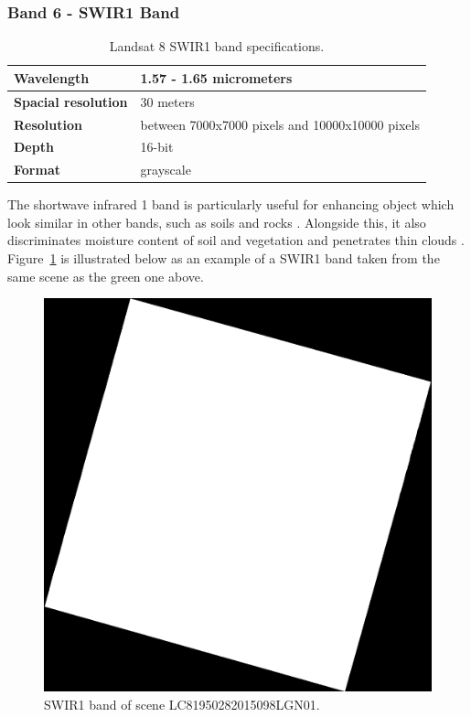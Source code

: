 \documentclass[12pt, a4paper]{report}
\begin{document}
	\subsubsection{Band 6 - SWIR1 Band}
	
	\begin{table} [h]
		\center
		\begin{tabular} {| l | l |}
			\hline
			\textbf{Wavelength} & {1.57 - 1.65 micrometers} \\ [0.2ex]
			\hline
			\textbf{Spacial resolution} & {30 meters} \\ [0.2ex]
			\hline
			\textbf{Resolution} & {between 7000x7000 pixels and 10000x10000 pixels} \\ [0.2ex]
			\hline
			\textbf{Depth} & {16-bit}\\ [0.2ex]
			\hline
			\textbf{Format} & {grayscale}\\ [0.2ex]
			\hline
		\end{tabular}
		\caption{Landsat 8 SWIR1 band specifications.}
		\label{table:swir1_table}
	\end{table}
	\par The shortwave infrared 1 band is particularly useful for enhancing object which look similar in other bands, such as soils and rocks \cite{bd}. Alongside this, it also discriminates moisture content of soil and vegetation and penetrates thin clouds \cite{bands}. Figure~\ref{fig:swir1} is illustrated below as an example of a SWIR1 band taken from the same scene as the green one above.
	\begin{figure}[h]
		\centering
		\includegraphics[scale=0.3]{../images/LC81950282015098LGN01_B6.png}
		\caption{SWIR1 band of scene LC81950282015098LGN01.}
		\label{fig:swir1}
	\end{figure}
	
\end{document}
